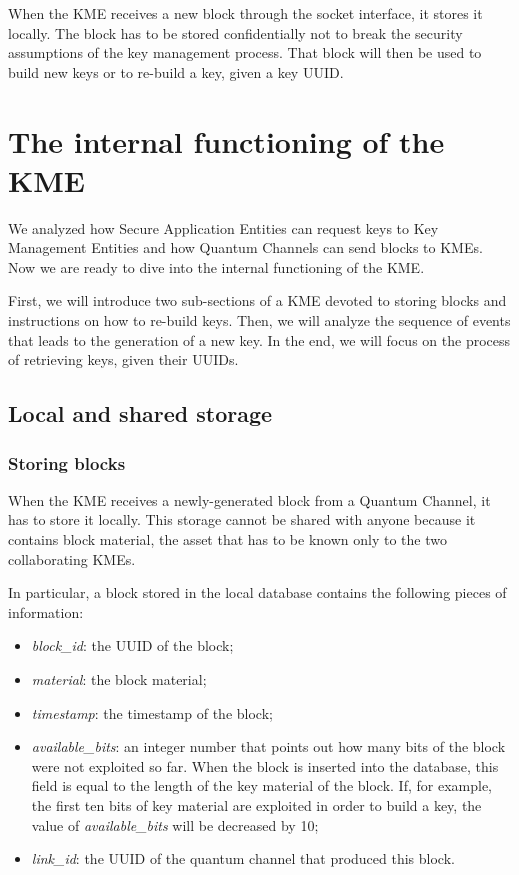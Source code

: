 When the KME receives a new block through the socket interface, it stores it locally. The block has to be stored confidentially not to break the security assumptions of the key management process. That block will then be used to build new keys or to re-build a key, given a key UUID.

\section{The internal functioning of the KME}
We analyzed how Secure Application Entities can request keys to Key Management Entities and how Quantum Channels can send blocks to KMEs. Now we are ready to dive into the internal functioning of the KME.

First, we will introduce two sub-sections of a KME devoted to storing blocks and instructions on how to re-build keys. Then, we will analyze the sequence of events that leads to the generation of a new key. In the end, we will focus on the process of retrieving keys, given their UUIDs.

\subsection{Local and shared storage}

\subsubsection{Storing blocks}
When the KME receives a newly-generated block from a Quantum Channel, it has to store it locally. This storage cannot be shared with anyone because it contains block material, the asset that has to be known only to the two collaborating KMEs.

In particular, a block stored in the local database contains the following pieces of information:

\begin{itemize}
    \item \textit{block\_id}: the UUID of the block;
    \item \textit{material}: the block material;
    \item \textit{timestamp}: the timestamp of the block;
    \item \textit{available\_bits}: an integer number that points out how many bits of the block were not exploited so far. When the block is inserted into the database, this field is equal to the length of the key material of the block. If, for example, the first ten bits of key material are exploited in order to build a key, the value of \textit{available\_bits} will be decreased by 10;
    \item \textit{link\_id}: the UUID of the quantum channel that produced this block.
\end{itemize}

